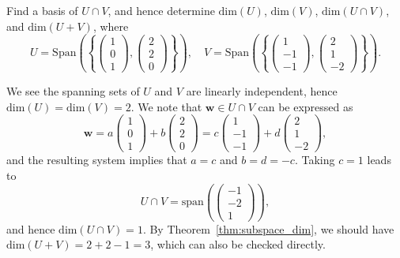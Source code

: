\documentclass[letter-paper]{tufte-book}
\newenvironment{example}[1][Example]{\begin{trivlist}
\item[\hskip \labelsep {\bfseries #1}]}{\end{trivlist}}
\newcommand{\wb}{{\boldsymbol{w}}}
\begin{document}
\begin{example}
  Find a basis of $U \cap V$, and hence determine $\mbox{dim}(U)$,
  $\mbox{dim}(V)$, $\mbox{dim}(U \cap V)$, and $\mbox{dim}(U+V)$, where
  \begin{equation*}
    U = \mbox{Span}\left(\left\{\begin{pmatrix}1 \\ 0\\ 1\end{pmatrix}, \begin{pmatrix}2 \\ 2\\ 0\end{pmatrix}\right\}\right), \quad V = \mbox{Span}\left(\left\{\begin{pmatrix}1 \\ -1\\ -1\end{pmatrix}, \begin{pmatrix}2 \\ 1\\ -2\end{pmatrix}\right\}\right).
  \end{equation*}
    
  We see the spanning sets of $U$ and $V$ are linearly independent, hence
  $\mbox{dim}(U) = \mbox{dim}(V) =2$. We note that $\wb \in U \cap V$ can be
  expressed as
  \begin{equation*}
    \wb = a \begin{pmatrix}1 \\ 0\\ 1\end{pmatrix} + b \begin{pmatrix}2 \\ 2\\ 0\end{pmatrix} = c \begin{pmatrix}1 \\ -1\\ -1\end{pmatrix} + d \begin{pmatrix}2 \\ 1\\ -2\end{pmatrix},
  \end{equation*}
  and the resulting system implies that $a=c$ and $b=d=-c$. Taking $c=1$ leads
  to
  \begin{equation*}
    U \cap V = \mbox{span}\left(\begin{pmatrix}-1 \\ -2\\ 1\end{pmatrix}\right),
  \end{equation*}
  and hence $\mbox{dim}(U \cap V) = 1$. By Theorem~\ref{thm:subspace_dim}, we
  should have $\mbox{dim}(U + V) = 2+2-1 = 3$, which can also be checked
  directly.
\end{example}
\end{document}
